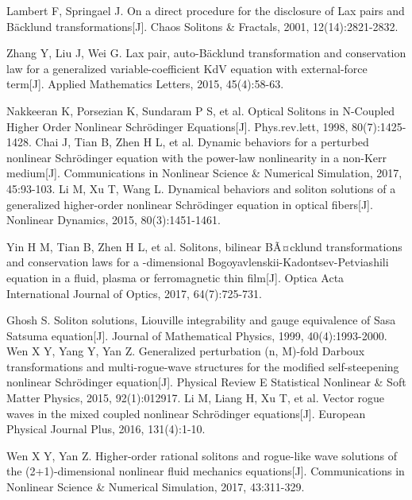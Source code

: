 \begin{thebibliography}{0}
Lambert F, Springael J. On a direct procedure for the disclosure of Lax pairs and Bäcklund transformations[J]. Chaos Solitons \& Fractals, 2001, 12(14):2821-2832.

Zhang Y, Liu J, Wei G. Lax pair, auto-Bäcklund transformation and conservation law for a generalized variable-coefficient KdV equation with external-force term[J]. Applied Mathematics Letters, 2015, 45(4):58-63.

Nakkeeran K, Porsezian K, Sundaram P S, et al. Optical Solitons in N-Coupled Higher Order Nonlinear Schrödinger Equations[J]. Phys.rev.lett, 1998, 80(7):1425-1428.
Chai J, Tian B, Zhen H L, et al. Dynamic behaviors for a perturbed nonlinear Schrödinger equation with the power-law nonlinearity in a non-Kerr medium[J]. Communications in Nonlinear Science \& Numerical Simulation, 2017, 45:93-103.
Li M, Xu T, Wang L. Dynamical behaviors and soliton solutions of a generalized higher-order nonlinear Schrödinger equation in optical fibers[J]. Nonlinear Dynamics, 2015, 80(3):1451-1461.

Yin H M, Tian B, Zhen H L, et al. Solitons, bilinear BÃ¤cklund transformations and conservation laws for a -dimensional Bogoyavlenskii-Kadontsev-Petviashili equation in a fluid, plasma or ferromagnetic thin film[J]. Optica Acta International Journal of Optics, 2017, 64(7):725-731.

 Ghosh S. Soliton solutions, Liouville integrability and gauge equivalence of Sasa Satsuma equation[J]. Journal of Mathematical Physics, 1999, 40(4):1993-2000.
Wen X Y, Yang Y, Yan Z. Generalized perturbation (n, M)-fold Darboux transformations and multi-rogue-wave structures for the modified self-steepening nonlinear Schrödinger equation[J]. Physical Review E Statistical Nonlinear \& Soft Matter Physics, 2015, 92(1):012917.
Li M, Liang H, Xu T, et al. Vector rogue waves in the mixed coupled nonlinear Schrödinger equations[J]. European Physical Journal Plus, 2016, 131(4):1-10.


 Wen X Y, Yan Z. Higher-order rational solitons and rogue-like wave solutions of the (2+1)-dimensional nonlinear fluid mechanics equations[J]. Communications in Nonlinear Science \& Numerical Simulation, 2017, 43:311-329.


\end{thebibliography}
